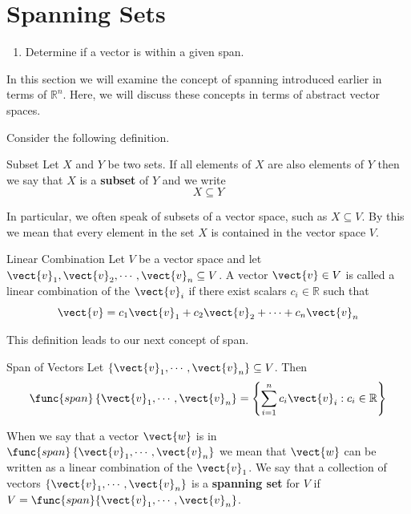 \section{Spanning Sets}

\begin{outcome}
\begin{enumerate}
\item[A.] Determine if a vector is within a given span.
\end{enumerate}
\end{outcome}

In this section we will examine the concept of spanning introduced earlier in terms of $\mathbb{R}^n$. Here, we will discuss these concepts in terms of abstract vector spaces. 

Consider the following definition. 

\begin{definition}{Subset}\label{def:subset}
Let $X$ and $Y$ be two sets. If all elements of $X$ are also elements of $Y$ then we say that $X$ is a \textbf{subset} of $Y$ and we write
\[
X \subseteq Y
\]
\end{definition}

In particular, we often speak of subsets of a vector space, such as $X \subseteq V$. By this we mean that every element in the set $X$ is contained in the vector space $V$. 

\begin{definition}{Linear Combination}\label{def:linearcombination}
Let $V$ be a vector space and let $\vect{v}_1, \vect{v}_2, \cdots, \vect{v}_n \subseteq V$. A vector $\vect{v} \in V$ is called a linear combination of the $\vect{v}_i$ if there exist scalars $c_i \in \mathbb{R}$ such that 
\[
\vect{v} = c_1 \vect{v}_1 + c_2 \vect{v}_2 + \cdots + c_n \vect{v}_n
\]
\end{definition}

This definition leads to our next concept of span.

\begin{definition}{Span of Vectors}\label{def:span}
Let $\{\vect{v}_{1},\cdots ,\vect{v}_{n}\} \subseteq V$. Then 
\begin{equation*}
\func{span}\left\{ \vect{v}_{1},\cdots ,\vect{v}_{n}\right\} = 
\left\{ \sum_{i=1}^{n}c_{i}\vect{v}_{i}: c_{i}\in \mathbb{R}
\right\} 
\end{equation*}
\end{definition}

When we say that a vector $\vect{w}$ is in $\func{span}\left\{ \vect{v}_{1},\cdots ,\vect{v}_{n}\right\}$ we mean that $\vect{w}$ can be written as a linear combination of the $\vect{v}_1$. We say that a collection of vectors $\{\vect{v}_{1},\cdots ,\vect{v}_{n}\}$ is a \textbf{spanning set} for $V$ if $V = \func{span} \{\vect{v}_{1},\cdots ,\vect{v}_{n}\}$. 

